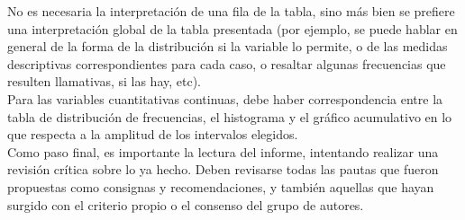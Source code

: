 \documentclass{../prob}
\begin{document}
No  es necesaria  la interpretación de una fila de la tabla,  sino  más  bien  se  prefiere  una interpretación  global  de  la  tabla  presentada  (por  ejemplo,  se  puede  hablar  en  general  de  la forma   de   la   distribución   si   la   variable   lo   permite,   o   de   las medidas   descriptivas correspondientes para cada caso, o resaltar algunas frecuencias que resulten llamativas, si las hay, etc).\\

Para  las  variables  cuantitativas  continuas,  debe  haber  correspondencia  entre  la tabla de  distribución  de  frecuencias,  el  histograma  y  el  gráfico  acumulativo en  lo  que  respecta  a  la amplitud de los intervalos elegidos.\\

Como paso final, es importante la lectura del informe, intentando realizar una revisión crítica  sobre  lo  ya  hecho.  Deben  revisarse  todas  las  pautas  que  fueron  propuestas  como consignas y recomendaciones, y también aquellas que hayan surgido con el criterio propio o el consenso del grupo de autores.
\end{document}
